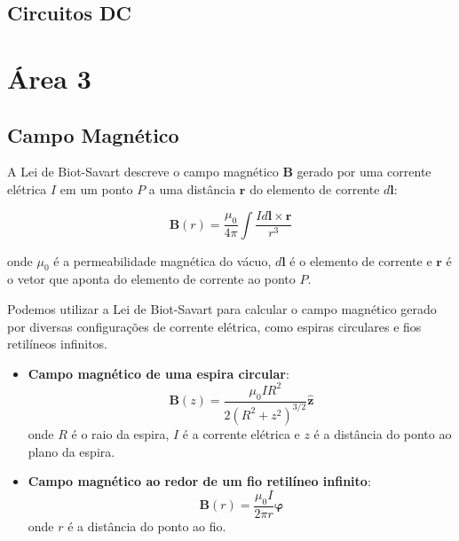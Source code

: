 \documentclass[12pt]{article}
\begin{document}
\subsection{Circuitos DC}

\newpage

\section{Área 3}

\subsection{Campo Magnético}

A Lei de Biot-Savart descreve o campo magnético \(\mathbf{B}\) gerado por uma corrente elétrica \(I\) em um ponto \(P\) a uma distância \(\mathbf{r}\) do elemento de corrente \(d\mathbf{l}\):

\begin{equation}\label{eq:lei_biot_savart}
    \boxed{\mathbf{B}(r) = \frac{\mu_0}{4\pi} \int \frac{I d\mathbf{l} \times \mathbf{r}}{r^3}}
\end{equation}

\noindent onde \(\mu_0\) é a permeabilidade magnética do vácuo, \(d\mathbf{l}\) é o elemento de corrente e \(\mathbf{r}\) é o vetor que aponta do elemento de corrente ao ponto \(P\).

Podemos utilizar a Lei de Biot-Savart para calcular o campo magnético gerado por diversas configurações de corrente elétrica, como espiras circulares e fios retilíneos infinitos.

\begin{itemize}
    \item [(a)] \textbf{Campo magnético de uma espira circular}:
        \begin{equation}
            \boxed{\mathbf{B}(z) = \frac{\mu_0 I R^2}{2(R^2 + z^2)^{3/2}} \hat{\mathbf{z}}}
        \end{equation}
        \noindent onde \(R\) é o raio da espira, \(I\) é a corrente elétrica e \(z\) é a distância do ponto ao plano da espira.
    \item [(b)] \textbf{Campo magnético ao redor de um fio retilíneo infinito}:
        \begin{equation}
            \boxed{\mathbf{B}(r) = \frac{\mu_0 I}{2\pi r}\hat{\boldsymbol{\varphi}}}
        \end{equation}
        \noindent onde \(r\) é a distância do ponto ao fio.
\end{itemize}
\end{document}
